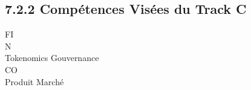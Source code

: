 \subsection{7.2.2 Compétences Visées du Track C}
\vspace{0.5em}
\vspace{0.5em}
\vspace{0.5em}
\vspace{0.5em}
FI\\
N\\
Tokenomics              Gouvernance\\
CO\\
\vspace{0.5em}
Produit                  Marché\\
\vspace{0.5em}
\vspace{0.5em}
\vspace{0.5em}
\vspace{0.5em}
